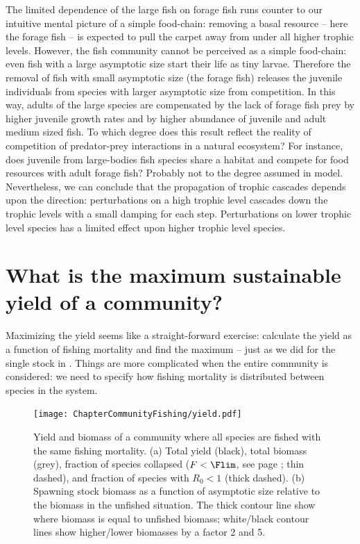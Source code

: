 The limited dependence of the large fish on forage fish runs counter to our intuitive mental picture of a simple food-chain: removing a basal resource -- here the forage fish -- is expected to pull the carpet away from under all higher trophic levels.  However, the fish community cannot be perceived as a simple food-chain: even fish with a large asymptotic size start their life as tiny larvae.  Therefore the removal of fish with small asymptotic size (the forage fish) releases the juvenile individuals from species with larger asymptotic size from competition.  In this way, adults of the large species are compensated by the lack of forage fish prey by higher juvenile growth rates and by higher abundance of juvenile and adult medium sized fish.  To which degree does this result reflect the reality of competition of predator-prey interactions in a natural ecosystem?  For instance, does juvenile from large-bodies fish species share a habitat and compete for food resources with adult forage fish?  Probably not to the degree assumed in model.  Nevertheless, we can conclude that the propagation of trophic cascades depends upon the direction: perturbations on a high trophic level cascades down the trophic levels with a small damping for each step.  Perturbations on lower trophic level species has a limited effect upon higher trophic level species.


\section{What is the maximum sustainable yield of a community?}
\label{sec:communityMSY}
Maximizing the yield seems like a straight-forward exercise: calculate the yield as a function of fishing mortality and find the maximum -- just as we did for the single stock in .  Things are more complicated when the entire community is considered: we need to specify how fishing mortality is distributed between species in the system.  

\begin{figure}[t]
  \centering
  \texttt{[image: ChapterCommunityFishing/yield.pdf]}
  \caption{Yield and biomass of a community where all species are fished with the same fishing mortality.  (a) Total yield (black), total biomass (grey), fraction of species collapsed ($F < \Flim$, see page \pageref{lab:Flim}; thin dashed), and fraction of species with $R_0 < 1$ (thick dashed).  (b) Spawning stock biomass as a function of asymptotic size relative to the biomass in the unfished situation.  The thick contour line show where biomass is equal to unfished biomass; white/black contour lines show higher/lower biomasses by a factor 2 and 5.}
  \label{fig:YieldvsF}
\end{figure}

